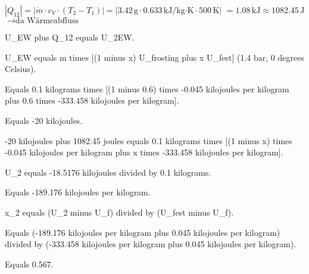 \( |Q_{12}| = |\dot{m} \cdot c_V \cdot (T_2 - T_1)| = |3.42 \, \text{g} \cdot 0.633 \, \text{kJ/kg·K} \cdot 500 \, \text{K}| \)  
\( = 1.08 \, \text{kJ} \approx 1082.45 \, \text{J} \)  
\( \rightarrow \text{da Wärmeabfluss} \)

U_EW plus Q_12 equals U_2EW.

U_EW equals m times [(1 minus x) U_frosting plus x U_fest] (1.4 bar, 0 degrees Celsius).

Equals 0.1 kilograms times [(1 minus 0.6) times -0.045 kilojoules per kilogram plus 0.6 times -333.458 kilojoules per kilogram].

Equals -20 kilojoules.

-20 kilojoules plus 1082.45 joules equals 0.1 kilograms times [(1 minus x) times -0.045 kilojoules per kilogram plus x times -333.458 kilojoules per kilogram].

U_2 equals -18.5176 kilojoules divided by 0.1 kilograms.

Equals -189.176 kilojoules per kilogram.

x_2 equals (U_2 minus U_f) divided by (U_fest minus U_f).

Equals (-189.176 kilojoules per kilogram plus 0.045 kilojoules per kilogram) divided by (-333.458 kilojoules per kilogram plus 0.045 kilojoules per kilogram).

Equals 0.567.